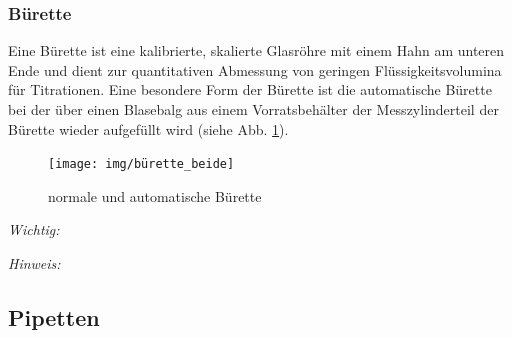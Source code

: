 \newpage


\subsubsection{Bürette}
Eine Bürette ist eine kalibrierte, skalierte Glasröhre mit einem Hahn am unteren Ende und dient zur quantitativen Abmessung von geringen Flüssigkeitsvolumina für Titrationen. Eine besondere Form der Bürette ist die automatische Bürette bei der über einen Blasebalg aus einem Vorratsbehälter der Messzylinderteil der Bürette wieder aufgefüllt wird (siehe Abb. \ref{fig:bürette}).

\begin{figure}[h!]
	\centering
	\texttt{[image: img/bürette\_beide]}
	\caption{normale und automatische Bürette}
	\label{fig:bürette}
\end{figure}
\FloatBarrier

\textit{Wichtig:}\\
\vspace*{-5mm}

	
	\vspace*{5mm}
	
	\textit{Hinweis:}\\
	\vspace*{-5mm}
	
	
	\newpage

\subsection{Pipetten}
